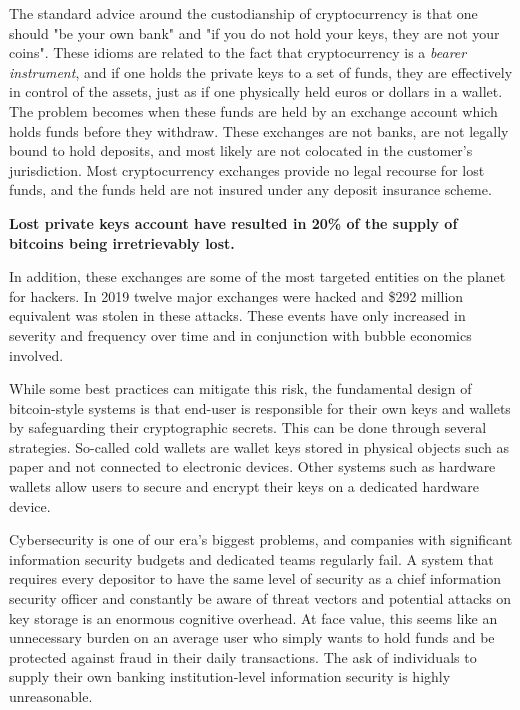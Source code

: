 The standard advice around the custodianship of cryptocurrency is that one
should "be your own bank" and "if you do not hold your keys, they are not your
coins". These idioms are related to the fact that cryptocurrency is a
\textit{bearer instrument}, and if one holds the private keys to a set of funds,
they are effectively in control of the assets, just as if one physically held
euros or dollars in a wallet. The problem becomes when these funds are held by
an exchange account which holds funds before they withdraw. These exchanges are
not banks, are not legally bound to hold deposits, and most likely are not
colocated in the customer's jurisdiction. Most cryptocurrency exchanges provide
no legal recourse for lost funds, and the funds held are not insured under any
deposit insurance scheme.

\begin{infobox}
 \textbf{Lost private keys account have resulted in 20\% of the supply of
  bitcoins being irretrievably lost.}
\end{infobox}

In addition, these exchanges are some of the most targeted entities on the
planet for hackers. In 2019 twelve major exchanges were hacked and \$292 million
equivalent was stolen in these attacks. These events have only increased in
severity and frequency over time and in conjunction with bubble economics
involved.

While some best practices can mitigate this risk, the fundamental design of
bitcoin-style systems is that end-user is responsible for their own keys and
wallets by safeguarding their cryptographic secrets. This can be done through
several strategies. So-called cold wallets are wallet keys stored in physical
objects such as paper and not connected to electronic devices. Other systems
such as hardware wallets allow users to secure and encrypt their keys on a
dedicated hardware device.

Cybersecurity is one of our era's biggest problems, and companies with
significant information security budgets and dedicated teams regularly fail. A
system that requires every depositor to have the same level of security as a
chief information security officer and constantly be aware of threat vectors and
potential attacks on key storage is an enormous cognitive overhead. At face
value, this seems like an unnecessary burden on an average user who simply wants
to hold funds and be protected against fraud in their daily transactions. The
ask of individuals to supply their own banking institution-level information
security is highly unreasonable.

